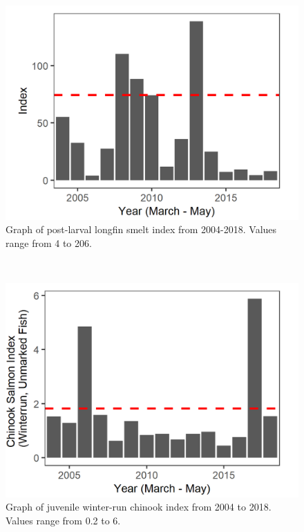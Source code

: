 \documentclass[
]{book}
\begin{document}
\begin{panel-grid}
\begin{columns-nocenter}
\begin{column800}
\begin{expand}
\begin{figure}
\includegraphics[width=15.25in]{figures/20mm_LFS_recent} \caption{Graph of post-larval longfin smelt index from 2004-2018. Values range from 4 to 206.}\label{fig:unnamed-chunk-44}
\end{figure}

\end{expand}

\end{column800}

\begin{column40}

~

\end{column40}

\begin{column800}

\begin{expand}

\begin{figure}
\includegraphics[width=15.25in]{figures/DJFMP_chinook_winterByLength_recyears} \caption{Graph of juvenile winter-run chinook index from 2004 to 2018. Values range from 0.2 to 6.}\label{fig:unnamed-chunk-45}
\end{figure}


\end{expand}
\end{column800}
\end{columns-nocenter}
\end{panel-grid}
\end{document}
